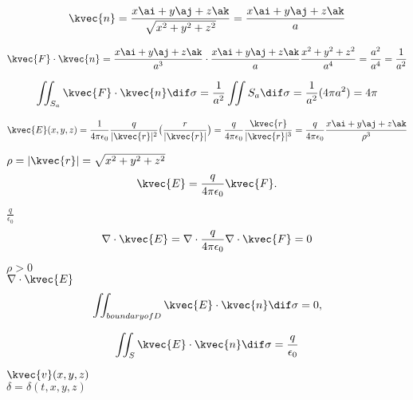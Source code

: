 
\begin{align*}
\kvec{n} = \frac{x\ai + y\aj + z\ak}{\sqrt{x^2 + y^2 + z^2}} = \frac{x \ai +y \aj + z \ak}{a} 
\end{align*}

\begin{align*}
\kvec{F} \cdot \kvec{n} = \frac{x\ai + y\aj + z\ak}{a^3} \cdot \frac{x\ai + y\aj + z\ak}{a} \frac{x^2 + y^2 + z^2}{a^4} = \frac{a^2}{a^4} = \frac{1}{a^2} 
\end{align*}

\begin{align*}
\iint_{S_a} \kvec{F} \cdot \kvec{n} \dif \sigma = \frac{1}{a^2} \iint{S_a} \dif \sigma = \frac{1}{a^2} (4 \pi a^2 ) = 4\pi 
\end{align*}

\begin{align*}
\kvec{E} (x,y,z) = \frac{1}{4 \pi \epsilon_0} \frac{q}{|\kvec{r}|^2} \big( \frac{r}{|\kvec{r}|} \big) = \frac{q}{4 \pi \epsilon_0} \frac{\kvec{r}}{|\kvec{r} |^3} = \frac{q}{4 \pi \epsilon_0} \frac{x\ai + y\aj + z\ak}{\rho^3} 
\end{align*}

\( \rho = |\kvec{r} | = \sqrt{x^2 + y^2 + z^2} \) \\

\begin{align*}
\kvec{E} = \frac{q}{4 \pi \epsilon_0 } \kvec{F}. 
\end{align*}

\( \frac{q}{\epsilon_0} \) \\

\begin{align*}
\nabla \cdot \kvec{E} = \nabla \cdot \frac{q}{4 \pi \epsilon_0} \nabla \cdot \kvec{F} = 0
\end{align*}

\( \rho > 0 \) \\
\( \nabla \cdot \kvec{E} \) \\

\begin{align*}
\iint_{boundary of D} \kvec{E} \cdot \kvec{n} \dif \sigma = 0,
\end{align*}

\begin{align*}
\iint_{S} \kvec{E} \cdot \kvec{n} \dif \sigma = \frac{q}{\epsilon_0}
\end{align*}


\( \kvec{v} (x,y,z) \) \\
\( \delta = \delta (t,x,y,z) \) \\

